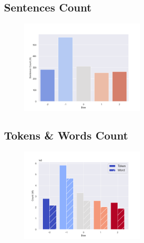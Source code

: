 \documentclass[11pt]{article}
\begin{document}
\subsection{Sentences Count}
\begin{center}


\CountSentencesTable
\begin{figure}[h!]
  \includegraphics[width=0.55\textwidth]{figs/count_sentences/count_sentences.png}
\end{figure}
\end{center}


\subsection{Tokens \& Words Count}
\begin{center}


\CountTWTable
\begin{figure}[h!]
  \includegraphics[width=0.55\textwidth]{figs/count_words/count_tokens_words.png}
\end{figure}
\end{center}
\end{document}
